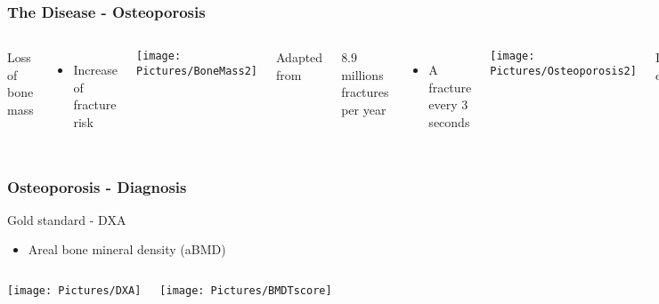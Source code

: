 \documentclass[xcolor=table,11pt]{beamer}
\begin{document}
	\begin{frame}[noframenumbering]
		\frametitle{The Disease - Osteoporosis}

		\begin{columns}
			Loss of bone mass
			\begin{itemize}
				\item Increase of fracture risk \cite{p1}
			\end{itemize}

			\vspace{5mm}

			\texttt{[image: Pictures/BoneMass2]}\\
			\begin{center}
				\tiny{Adapted from \cite{p3}}
			\end{center}

			8.9 millions fractures per year \cite{p2}
			\begin{itemize}
				\item A fracture every 3 seconds
			\end{itemize}

			\vspace{5mm}

			\texttt{[image: Pictures/Osteoporosis2]}\\
			\begin{center}
				\tiny{Image from eurospinepatientline.org}
			\end{center}

		\end{columns}

	\end{frame}

	\begin{frame}
		\frametitle{Osteoporosis - Diagnosis}

		Gold standard - DXA
		\begin{itemize}
			\item Areal bone mineral density (aBMD)
		\end{itemize}

		\begin{columns}
			\column{0.4\linewidth}
			\centering
			\texttt{[image: Pictures/DXA]}\\
			\tiny{\cite{p4}}

			\column{0.55\linewidth}
			\centering
			\texttt{[image: Pictures/BMDTscore]}\\
			\tiny{\cite{p5}}

		\end{columns}

	\end{frame}
\end{document}
